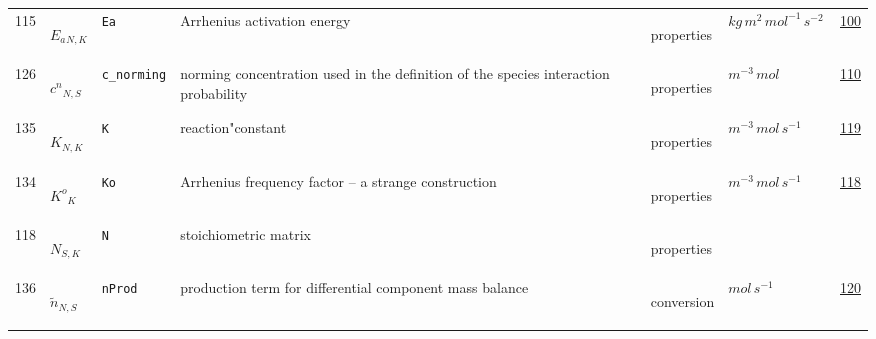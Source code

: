 \begin{longtable}{|p{1cm}|p{2.5cm}|p{4.5cm}|p{8cm}|p{3.0cm}|p{3cm}|p{1cm}|}
            115
             & \hypertarget{"v:115"}{ $ {E_a}{_{N, K}} $}
             & \verb|Ea|
             & Arrhenius activation energy
             & \begin{lay}properties \end{lay}
             & $ kg \,m^{2} \,mol^{-1} \,s^{-2} \, $
             &                 \hyperlink{"e:100"}{ 100 }
                 \\
            126
             & \hypertarget{"v:126"}{ $ {c^n}{_{N, S}} $}
             & \verb|c_norming|
             & norming concentration used in the definition of the species interaction probability
             & \begin{lay}properties \end{lay}
             & $ m^{-3} \,mol \, $
             &                 \hyperlink{"e:110"}{ 110 }
                 \\
            135
             & \hypertarget{"v:135"}{ $ {K}{_{N, K}} $}
             & \verb|K|
             & reaction"constant
             & \begin{lay}properties \end{lay}
             & $ m^{-3} \,mol \,s^{-1} \, $
             &                 \hyperlink{"e:119"}{ 119 }
                 \\
            134
             & \hypertarget{"v:134"}{ $ {{K^o}}{_{K}} $}
             & \verb|Ko|
             & Arrhenius frequency factor -- a strange construction
             & \begin{lay}properties \end{lay}
             & $ m^{-3} \,mol \,s^{-1} \, $
             &                 \hyperlink{"e:118"}{ 118 }
                 \\
            118
             & \hypertarget{"v:118"}{ $ {N}{_{S, K}} $}
             & \verb|N|
             & stoichiometric matrix
             & \begin{lay}properties \end{lay}
             & $  $
             & \\
            136
             & \hypertarget{"v:136"}{ $ {{\tilde{n}}}{_{N, S}} $}
             & \verb|nProd|
             & production term for differential component mass balance
             & \begin{lay}conversion \end{lay}
             & $ mol \,s^{-1} \, $
             &                 \hyperlink{"e:120"}{ 120 }
                 \\
    \end{longtable}